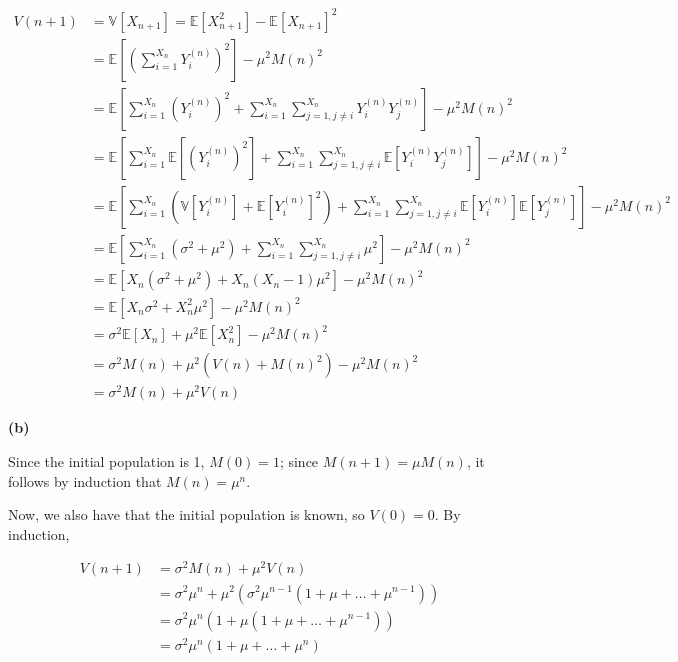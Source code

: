 \[
\begin{align}
V(n + 1) &= \mathbb{V}[X_{n + 1}] = \mathbb{E}[X_{n + 1}^2] - \mathbb{E}[X_{n + 1}]^2 \\
&= \mathbb{E}\left[\left( \sum_{i = 1}^{X_n} Y_i^{(n)} \right)^2\right] - \mu^2 M(n)^2 \\
&= \mathbb{E}\left[ \sum_{i = 1}^{X_n} \left( Y_i^{(n)} \right)^2 + \sum_{i = 1}^{X_n} \sum_{j = 1, j \neq i}^{X_n} Y_i^{(n)} Y_j^{(n)} \right] - \mu^2 M(n)^2 \\
&= \mathbb{E}\left[ \sum_{i = 1}^{X_n} \mathbb{E}\left[\left( Y_i^{(n)} \right)^2\right] + \sum_{i = 1}^{X_n} \sum_{j = 1, j \neq i}^{X_n} \mathbb{E}\left[ Y_i^{(n)} Y_j^{(n)} \right] \right] - \mu^2 M(n)^2 \\
&= \mathbb{E}\left[ \sum_{i = 1}^{X_n} \left( \mathbb{V}[Y_i^{(n)}] +  \mathbb{E}\left[ Y_i^{(n)} \right]^2 \right) + \sum_{i = 1}^{X_n} \sum_{j = 1, j \neq i}^{X_n} \mathbb{E}\left[ Y_i^{(n)} \right] \mathbb{E} \left[ Y_j^{(n)} \right] \right] - \mu^2 M(n)^2 \\
&= \mathbb{E}\left[ \sum_{i = 1}^{X_n} \left( \sigma^2 + \mu^2 \right) + \sum_{i = 1}^{X_n} \sum_{j = 1, j \neq i}^{X_n} \mu^2 \right] - \mu^2 M(n)^2 \\
&= \mathbb{E} \left[ X_n (\sigma^2 + \mu^2) + X_n (X_n - 1) \mu^2 \right] - \mu^2 M(n)^2 \\
&= \mathbb{E} \left[ X_n \sigma^2 + X_n^2 \mu^2 \right] - \mu^2 M(n)^2 \\
&= \sigma^2 \mathbb{E} [ X_n ] + \mu^2 \mathbb{E} [ X_n^2 ] - \mu^2 M(n)^2 \\
&= \sigma^2 M(n) + \mu^2 (V(n) + M(n)^2) - \mu^2 M(n)^2 \\
&= \sigma^2 M(n) + \mu^2 V(n)
\end{align}
\]

\textbf{(b)}

Since the initial population is 1, \(M(0) = 1\); since
\(M(n + 1) = \mu M(n)\), it follows by induction that \(M(n) = \mu^n\).

Now, we also have that the initial population is known, so \(V(0) = 0\).
By induction,

\[
\begin{align}
V(n + 1) &= \sigma^2 M(n) + \mu^2 V(n) \\
&= \sigma^2 \mu^n + \mu^2 \left( \sigma^2 \mu^{n - 1} \left( 1 + \mu + \dots + \mu^{n - 1}\right) \right) \\
&= \sigma^2 \mu^n \left(1 + \mu \left( 1 + \mu + \dots + \mu^{n - 1} \right) \right) \\
&= \sigma^2 \mu^n \left(1 + \mu + \dots + \mu^n \right)
\end{align}
\]

